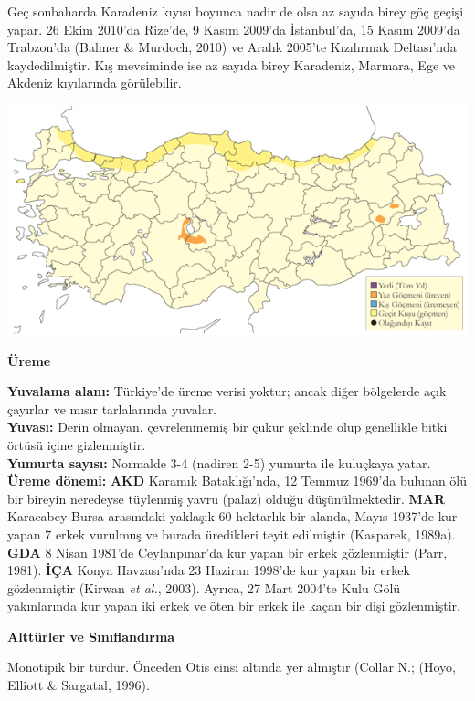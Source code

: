 \documentclass[
  a4paper,
  DIV=11,
  numbers=noendperiod]{scrreprt}
\begin{document}
Geç sonbaharda Karadeniz kıyısı boyunca nadir de olsa az sayıda birey
göç geçişi yapar. 26 Ekim 2010'da Rize'de, 9 Kasım 2009'da İstanbul'da,
15 Kasım 2009'da Trabzon'da (Balmer \& Murdoch, 2010) ve Aralık 2005'te
Kızılırmak Deltası'nda kaydedilmiştir. Kış mevsiminde ise az sayıda
birey Karadeniz, Marmara, Ege ve Akdeniz kıyılarında görülebilir.

\includegraphics{images/harita_Page_114.png}

\textbf{Üreme}

\textbf{Yuvalama alanı:} Türkiye'de üreme verisi yoktur; ancak diğer
bölgelerde açık çayırlar ve mısır tarlalarında yuvalar.\\
\textbf{Yuvası:} Derin olmayan, çevrelenmemiş bir çukur şeklinde olup
genellikle bitki örtüsü içine gizlenmiştir.\\
\textbf{Yumurta sayısı:} Normalde 3-4 (nadiren 2-5) yumurta ile
kuluçkaya yatar.\\
\textbf{Üreme dönemi:} \textbf{AKD} Karamık Bataklığı'nda, 12 Temmuz
1969'da bulunan ölü bir bireyin neredeyse tüylenmiş yavru (palaz) olduğu
düşünülmektedir. \textbf{MAR} Karacabey-Bursa arasındaki yaklaşık 60
hektarlık bir alanda, Mayıs 1937'de kur yapan 7 erkek vurulmuş ve burada
üredikleri teyit edilmiştir (Kasparek, 1989a). \textbf{GDA} 8 Nisan
1981'de Ceylanpınar'da kur yapan bir erkek gözlenmiştir (Parr, 1981).
\textbf{İÇA} Konya Havzası'nda 23 Haziran 1998'de kur yapan bir erkek
gözlenmiştir (Kirwan \emph{et al.}, 2003). Ayrıca, 27 Mart 2004'te Kulu
Gölü yakınlarında kur yapan iki erkek ve öten bir erkek ile kaçan bir
dişi gözlenmiştir.

\textbf{Alttürler ve Sınıflandırma}

Monotipik bir türdür. Önceden Otis cinsi altında yer almıştır (Collar
N.; (Hoyo, Elliott \& Sargatal, 1996).

\end{document}
